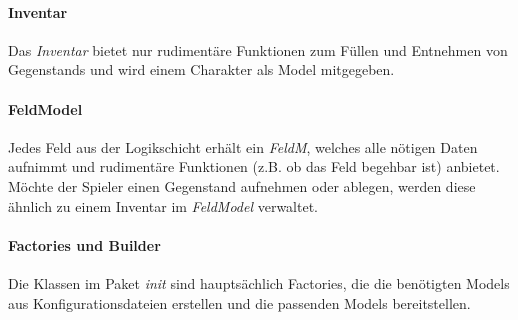 \paragraph{Inventar}
Das \textit{Inventar} bietet nur rudimentäre Funktionen zum Füllen und Entnehmen von 
\glspl{Gegenstand} und wird einem \gls{Charakter} als Model mitgegeben.

\paragraph{FeldModel}
Jedes \gls{Feld} aus der Logikschicht erhält ein \textit{FeldM}, welches alle nötigen Daten aufnimmt 
und rudimentäre Funktionen (z.B. ob das \gls{Feld} begehbar ist) anbietet. Möchte der \gls{Spieler} 
einen \gls{Gegenstand} aufnehmen oder ablegen, werden diese ähnlich zu einem \gls{Inventar} im 
\textit{FeldModel} verwaltet.

\paragraph{Factories und Builder}
Die Klassen im Paket \textit{init} sind hauptsächlich Factories, die die benötigten Models aus 
Konfigurationsdateien erstellen und die passenden Models bereitstellen.

